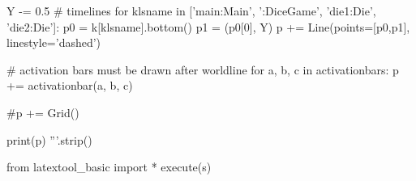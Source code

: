 \begin{python}
Y -= 0.5
# timelines
for klsname in ['main:Main', ':DiceGame', 'die1:Die', 'die2:Die']:
    p0 = k[klsname].bottom()
    p1 = (p0[0], Y)
    p += Line(points=[p0,p1], linestyle='dashed')

# activation bars must be drawn after worldline
for a, b, c in activationbars:
    p += activationbar(a, b, c)
    
#p += Grid()

print(p)
'''.strip()

from latextool_basic import *
execute(s)
\end{python}
